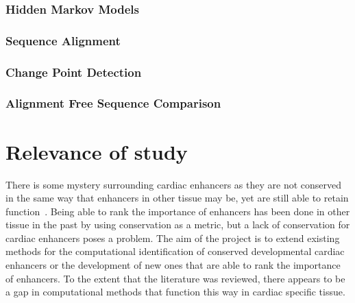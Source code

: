\documentclass[12pt,a4paper]{article}
\begin{document}
            \subsubsection{Hidden Markov Models}
             
            
            \subsubsection{Sequence Alignment}
            
            
            \subsubsection{Change Point Detection}
            
            
            
            \subsubsection{Alignment Free Sequence Comparison}
            
            
            
            
            
        
    \section{Relevance of study}
        There is some mystery surrounding cardiac enhancers as they are not conserved in the same way that enhancers in other tissue may be, yet are still able to retain function~\cite{harvey1996nk, blow2010chip}. Being able to rank the importance of enhancers has been done in other tissue in the past by using conservation as a metric, but a lack of conservation for cardiac enhancers poses a problem.
        The aim of the project is to extend existing methods for the computational identification of conserved developmental cardiac enhancers or the development of new ones that are able to rank the importance of enhancers. To the extent that the literature was reviewed, there appears to be a gap in computational methods that function this way in cardiac specific tissue.
        
\end{document}
